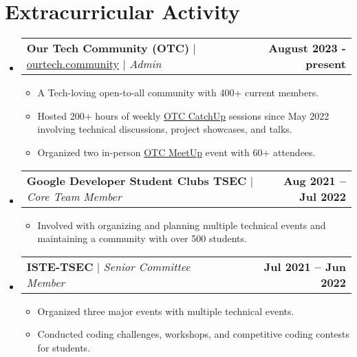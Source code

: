 \documentclass[letterpaper,11pt]{article}
\makeatletter
\newcommand{\resumeItem}[1]{
  \item\small{
    {#1 \vspace{-2pt}}
  }
}
\newcommand{\resumeProjectHeading}[2]{
    \item
    \begin{tabular*}{1.001\textwidth}{l@{\extracolsep{\fill}}r}
      \small#1 & \textbf{\small #2}\\
    \end{tabular*}\vspace{-7pt}
}
\newcommand{\resumeSubHeadingListStart}{\begin{itemize}[leftmargin=0.0in, label={}]}
\newcommand{\resumeSubHeadingListEnd}{\end{itemize}}
\newcommand{\resumeItemListStart}{\begin{itemize}}
\newcommand{\resumeItemListEnd}{\end{itemize}\vspace{-5pt}}
\makeatother
\begin{document}
\section{Extracurricular Activity}
    \vspace{-7pt}
    \resumeSubHeadingListStart
        \resumeProjectHeading
            {\textbf{\normalsize{Our Tech Community (OTC)}} $|$ \normalfont\href{https://ourtech.community}{ourtech.community} $|$ \emph{Admin}}{August 2023 - present}
            \resumeItemListStart
                \resumeItem{A Tech-loving open-to-all community with 400+ current members.}
                \resumeItem{Hosted 200+ hours of weekly \href{https://catchup.ourtech.community}{OTC CatchUp} sessions since May 2022 involving technical discussions, project showcases, and talks.}
                \resumeItem{Organized two in-person \href{https://meetup.ourtech.community}{OTC MeetUp} event with 60+ attendees.}
            \resumeItemListEnd
        \vspace{-18pt}

        \resumeProjectHeading
            {\textbf{\normalsize{Google Developer Student Clubs TSEC}} $|$ \emph{Core Team Member}}{Aug 2021 -- Jul 2022}
            \resumeItemListStart
                \resumeItem{Involved with organizing and planning multiple technical events and maintaining a community with over 500 students.}
            \resumeItemListEnd
        \vspace{-18pt}

        \resumeProjectHeading
            {\textbf{\normalsize{ISTE-TSEC}} $|$ \emph{Senior Committee Member}}{Jul 2021 -- Jun 2022}
            \resumeItemListStart
                \resumeItem{Organized three major events with multiple technical events.}
                \resumeItem{Conducted coding challenges, workshops, and competitive coding contests for students.}
            \resumeItemListEnd

    \resumeSubHeadingListEnd
\vspace{-8pt}
\end{document}
